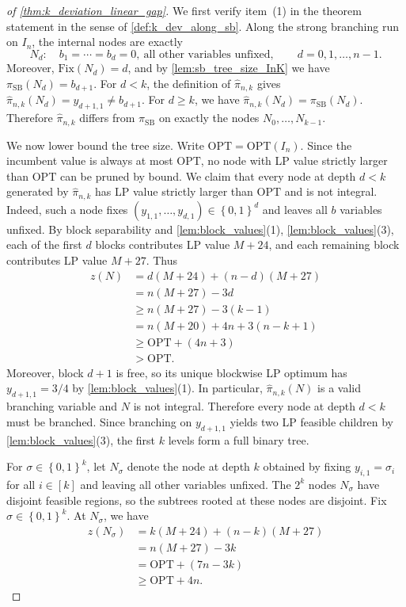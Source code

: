 \documentclass[smallextended,envcountsect]{svjour3} %
\newcommand{\set}[1]{\left\{#1\right\}}
\newcommand{\0}{\mathbf{0}}
\newcommand{\1}{\mathbf{1}} %
\begin{document}
\begin{proof}[of \cref{thm:k_deviation_linear_gap}]
	We first verify item~(1) in the theorem statement in the sense of \cref{def:k_dev_along_sb}.
	Along the strong branching run on $I_n$, the internal nodes are exactly
	\[
		N_d:\quad b_1=\cdots=b_d=0,\ \text{all other variables unfixed},\qquad d=0,1,\dots,n-1.
	\]
	Moreover, $\mathrm{Fix}(N_d)=d$, and by \cref{lem:sb_tree_size_InK} we have $\pi_{\mathrm{SB}}(N_d)=b_{d+1}$.
	For $d<k$, the definition of $\hat\pi_{n,k}$ gives $\hat\pi_{n,k}(N_d)=y_{d+1,1}\neq b_{d+1}$.
	For $d\ge k$, we have $\hat\pi_{n,k}(N_d)=\pi_{\mathrm{SB}}(N_d)$.
	Therefore $\hat\pi_{n,k}$ differs from $\pi_{\mathrm{SB}}$ on exactly the nodes $N_0,\dots,N_{k-1}$.

	We now lower bound the tree size.
	Write $\mathrm{OPT}=\mathrm{OPT}(I_n)$.
	Since the incumbent value is always at most $\mathrm{OPT}$, no node with LP value strictly larger than $\mathrm{OPT}$ can be pruned by bound.
	We claim that every node at depth $d<k$ generated by $\hat\pi_{n,k}$ has LP value strictly larger than $\mathrm{OPT}$ and is not integral.
	Indeed, such a node fixes $(y_{1,1},\dots,y_{d,1})\in\set{0,1}^d$ and leaves all $b$ variables unfixed.
	By block separability and \cref{lem:block_values}(1), \cref{lem:block_values}(3), each of the first $d$ blocks contributes LP value $M+24$, and each remaining block contributes LP value $M+27$.
	Thus
	\begin{align*}
		z(N)
				& = d(M+24)+(n-d)(M+27) \\
				& = n(M+27)-3d \\
				& \ge n(M+27)-3(k-1) \\
				& = n(M+20)+4n+3(n-k+1) \\
				& \ge \mathrm{OPT}+(4n+3) \\
				& > \mathrm{OPT}.
		\end{align*}
		Moreover, block $d+1$ is free, so its unique blockwise LP optimum has $y_{d+1,1}=3/4$ by \cref{lem:block_values}(1).
		In particular, $\hat\pi_{n,k}(N)$ is a valid branching variable and $N$ is not integral.
		Therefore every node at depth $d<k$ must be branched.
		Since branching on $y_{d+1,1}$ yields two LP feasible children by \cref{lem:block_values}(3), the first $k$ levels form a full binary tree.

	For $\sigma\in\set{0,1}^k$, let $N_\sigma$ denote the node at depth $k$ obtained by fixing $y_{i,1}=\sigma_i$ for all $i\in[k]$ and leaving all other variables unfixed.
	The $2^k$ nodes $N_\sigma$ have disjoint feasible regions, so the subtrees rooted at these nodes are disjoint.
		Fix $\sigma\in\set{0,1}^k$.
		At $N_\sigma$, we have
		\begin{align*}
			z(N_\sigma)
			 & = k(M+24)+(n-k)(M+27) \\
			 & = n(M+27)-3k \\
			 & = \mathrm{OPT}+(7n-3k) \\
			 & \ge \mathrm{OPT}+4n.
		\end{align*}


\end{proof}
\end{document}

